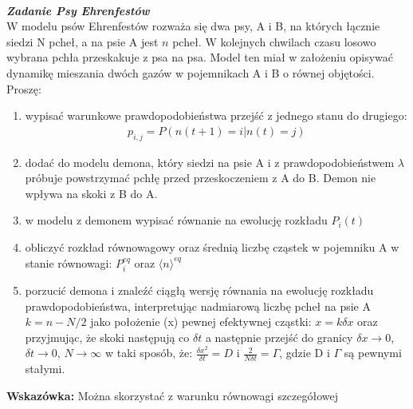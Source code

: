 \documentclass[11pt,a4paper]{article}
\newcounter{zadanie}\newcommand{\zadanie}[1][]{\addtocounter{zadanie}{1} ~\\  {\bf \emph{Zadanie \arabic{zadanie} #1 }} \\}
\begin{document}
\zadanie[Psy Ehrenfestów]


W modelu psów Ehrenfestów rozważa się dwa psy, A i B, na których łącznie 
siedzi N pcheł, a na psie A jest $n$ pcheł. W kolejnych chwilach czasu losowo 
wybrana pchła przeskakuje z psa na psa.  
Model ten miał w założeniu opisywać dynamikę 
mieszania dwóch gazów w pojemnikach A i B o równej objętości.
Proszę:
\vspace{0.5cm}
\begin{enumerate}
  \item wypisać warunkowe prawdopodobieństwa przejść z jednego stanu do drugiego:
  \begin{align*}
    p_{i,j} = P(n(t+1) = i | n(t) = j)
  \end{align*}
  \item dodać do modelu demona, który siedzi na psie A i z prawdopodobieństwem $\lambda$ 
  próbuje powstrzymać pchłę przed przeskoczeniem z A do B. Demon nie wpływa na skoki z B do A. 
  \item w modelu z demonem wypisać równanie na ewolucję rozkładu $P_i(t)$
  \item obliczyć rozkład równowagowy oraz średnią liczbę cząstek w pojemniku A w stanie równowagi:
  $P_i^{eq}$ oraz $\langle n \rangle^{eq}$ 
  \item porzucić demona i znaleźć ciągłą wersję równania na ewolucję 
  rozkładu prawdopodobieństwa, interpretując nadmiarową liczbę pcheł na psie A $k = n - N/2$
  jako położenie (x) pewnej efektywnej cząstki: $x = k\delta x$ oraz 
  przyjmując, że skoki następują co $\delta t$ a następnie 
  przejść do granicy $\delta x \to 0$, $ \delta t \to 0$, $N \to \infty$ 
  w taki sposób, że: 
  $\frac{\delta x^2}{\delta t} = D$ i 
  $\frac{2}{N\delta t} = \Gamma$, gdzie D i $\Gamma$ są pewnymi stałymi.

\end{enumerate}

\vspace{0.5cm}

{\bf Wskazówka:} Można skorzystać z warunku równowagi szczegółowej
\end{document}
